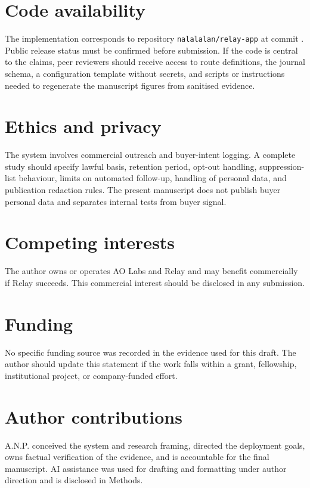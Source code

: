 \documentclass[12pt,letterpaper]{article}
\begin{document}
\section{Code availability}

The implementation corresponds to repository \texttt{nalalalan/relay-app} at commit \texttt{}. Public release status must be confirmed before submission. If the code is central to the claims, peer reviewers should receive access to route definitions, the journal schema, a configuration template without secrets, and scripts or instructions needed to regenerate the manuscript figures from sanitised evidence.

\section{Ethics and privacy}

The system involves commercial outreach and buyer-intent logging. A complete study should specify lawful basis, retention period, opt-out handling, suppression-list behaviour, limits on automated follow-up, handling of personal data, and publication redaction rules. The present manuscript does not publish buyer personal data and separates internal tests from buyer signal.

\section{Competing interests}

The author owns or operates AO Labs and Relay and may benefit commercially if Relay succeeds. This commercial interest should be disclosed in any submission.

\section{Funding}

No specific funding source was recorded in the evidence used for this draft. The author should update this statement if the work falls within a grant, fellowship, institutional project, or company-funded effort.

\section{Author contributions}

A.N.P. conceived the system and research framing, directed the deployment goals, owns factual verification of the evidence, and is accountable for the final manuscript. AI assistance was used for drafting and formatting under author direction and is disclosed in Methods.

\printbibliography
\end{document}
